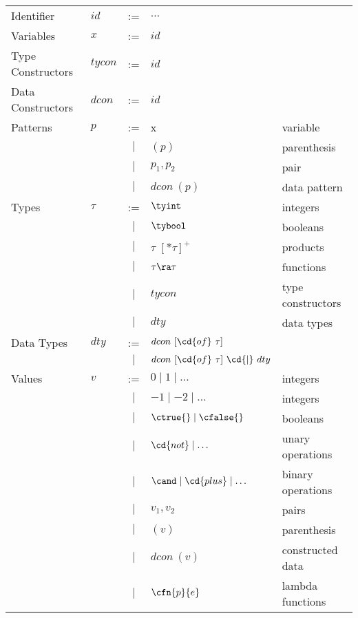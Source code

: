 \begin{cluster}
\label{grp:def:sparc::syntax}

\begin{definition}
\label{def:sparc::syntax}
\setlength{\tabcolsep}{20mm}
\begin{tabular}{llcll}
Identifier
& $id$ & := & $\ldots$
\\

Variables
& $x$ & := & $id$
\\

Type Constructors 
& $tycon$ & := & $id$
\\

Data Constructors 
& $dcon$ & := & $id$
\\

Patterns & $p$ 
& := & x & variable
\\
& & $\mid$  & $( p )$ & parenthesis
\\
& & $\mid$  & $p_1, p_2$ & pair
\\
& & $\mid$  & $dcon~( p )$ & data pattern
\\

Types & $\tau$ &  := & $\tyint$  & integers
\\
& &  $\mid$ &   $\tybool$  & booleans
\\
& &  $\mid$  & $\tau$ $[ * \tau ]^+$  & products
\\
& &  $\mid$  & $\tau \ra \tau$ & functions
\\
& & $\mid$ & $tycon$         &  type constructors
\\
& & $\mid$ & $dty$ & data types
\\

Data Types & $dty$
& := &   $dcon~[\cd{of}~\tau]$ 
\\
&  & $\mid$ &  $dcon~[ \cd{of}~\tau ]~\cd{|}~dty$
\\

Values & $v$
& := & $0  \mid  1  \mid  \ldots$ &  integers
\\
& & $\mid$ &  $-1  \mid -2  \mid \ldots$ &  integers
\\
& & $\mid$ & $\ctrue{} \mid  \cfalse{}$ & booleans
\\
& & $\mid$ & $\cd{not}  \mid \ldots$ & unary operations
\\
& & $\mid$ & $\cand  \mid  \cd{plus}  \mid  \ldots$ & binary operations
\\
& & $\mid$ & $v_1, v_2$  & pairs
\\
& & $\mid$ & $( v )$   & parenthesis
\\
& & $\mid$ & $dcon~( v )$  & constructed data
\\
& & $\mid$ & $\cfn{p}{e}$ & lambda functions
\\


\end{tabular}
\end{definition}
\end{cluster}
